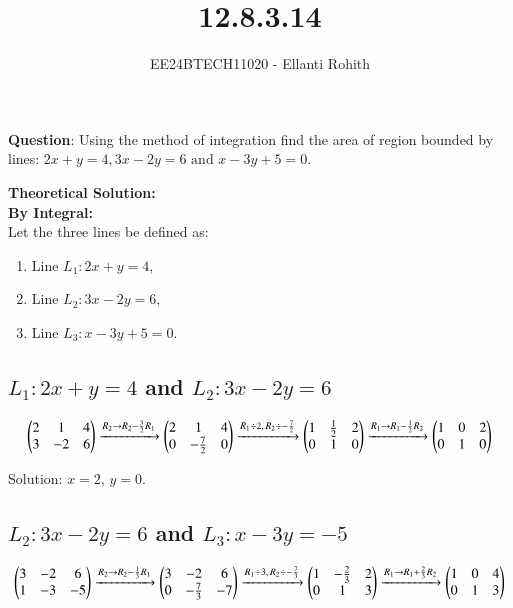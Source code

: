 \documentclass[journal]{IEEEtran}
\numberwithin{equation}{enumi}
\numberwithin{figure}{enumi}
\renewcommand{\thetable}{\theenumi}
\begin{document}

\vspace{3cm}

\title{12.8.3.14}
\author{EE24BTECH11020 - Ellanti Rohith}
\maketitle

\renewcommand{\thefigure}{\theenumi}
\renewcommand{\thetable}{\theenumi}

\textbf{Question}: Using the method of integration find the area of region bounded by lines: $2x+y=4,3x-2y=6\text{ and } x-3y+5=0$.
\\
\vspace{3.5pt}


\textbf{Theoretical Solution:} \\
\textbf{By Integral:}\\
Let the three lines be defined as:  
\begin{enumerate}
    \item Line $ L_1: 2x + y = 4 $,  
    \item Line $ L_2: 3x - 2y = 6 $,  
    \item Line $ L_3: x - 3y + 5 = 0 $.  

\end{enumerate}
  
\subsection*{ $L_1: 2x + y = 4$ and $L_2: 3x - 2y = 6$}

\begin{align*}
\begin{pmatrix}
2 & 1 & 4 \\
3 & -2 & 6
\end{pmatrix}
\xrightarrow{R_2 \to R_2 - \frac{3}{2}R_1}
\begin{pmatrix}
2 & 1 & 4 \\
0 & -\frac{7}{2} & 0
\end{pmatrix}
\xrightarrow{R_1 \div 2, \, R_2 \div -\frac{7}{2}}
\begin{pmatrix}
1 & \frac{1}{2} & 2 \\
0 & 1 & 0
\end{pmatrix}
\xrightarrow{R_1 \to R_1 - \frac{1}{2}R_2}
\begin{pmatrix}
1 & 0 & 2 \\
0 & 1 & 0
\end{pmatrix}
\end{align*}

Solution: $x = 2, \, y = 0$.

\subsection*{$L_2: 3x - 2y = 6$ and $L_3: x - 3y = -5$}

\begin{align*}
\begin{pmatrix}
3 & -2 & 6 \\
1 & -3 & -5
\end{pmatrix}
\xrightarrow{R_2 \to R_2 - \frac{1}{3}R_1}
\begin{pmatrix}
3 & -2 & 6 \\
0 & -\frac{7}{3} & -7
\end{pmatrix}
\xrightarrow{R_1 \div 3, \, R_2 \div -\frac{7}{3}}
\begin{pmatrix}
1 & -\frac{2}{3} & 2 \\
0 & 1 & 3
\end{pmatrix}
\xrightarrow{R_1 \to R_1 + \frac{2}{3}R_2}
\begin{pmatrix}
1 & 0 & 4 \\
0 & 1 & 3
\end{pmatrix}
\end{align*}
\end{document}
